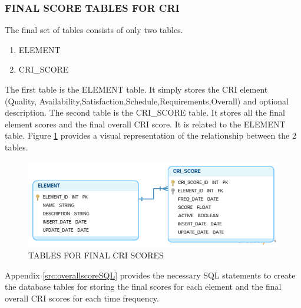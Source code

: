 \documentclass[SDSUThesis.tex]{subfiles}
\begin{document}
        \subsubsection{FINAL SCORE TABLES FOR CRI}
            The final set of tables consists of only two tables.  
            \begin{enumerate}
                \item ELEMENT
                \item CRI\_SCORE
            \end{enumerate}
            The first
            table is the ELEMENT table.  It simply stores the CRI element 
            (Quality, Availability,Satisfaction,Schedule,Requirements,Overall) and 
            optional description. The second table is the CRI\_SCORE table.  
            It stores all the final element scores and the final overall CRI
            score.  It is related to the ELEMENT table.  Figure 
            \ref{fig:final_score_tables} provides a visual representation of the 
            relationship between the 2 tables. 
            
           \begin{figure}[hbt]
                \centering
                \includegraphics[scale=.52]{images/final_score_tables.png}
                \caption{TABLES FOR FINAL CRI SCORES}
                \label{fig:final_score_tables}
            \end{figure}
            
            
            Appendix \ref{src:overallscoreSQL} provides the necessary SQL 
            statements to create the 
            database tables for storing the final scores for each element and the final 
            overall CRI scores for each time frequency.
\end{document}
